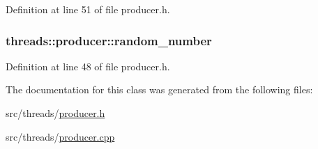 Definition at line 51 of file producer.\+h.

\subsubsection[{\texorpdfstring{random\+\_\+number}{random_number}}]{ threads\+::producer\+::random\+\_\+number\hspace{0.3cm}{\ttfamily [protected]}}\hypertarget{classthreads_1_1producer_a5ca9ba785a3f49123aea07f960e5497d}{}\label{classthreads_1_1producer_a5ca9ba785a3f49123aea07f960e5497d}


Definition at line 48 of file producer.\+h.



The documentation for this class was generated from the following files\+:\begin{DoxyCompactItemize}
\item 
src/threads/\hyperlink{producer_8h}{producer.\+h}\item 
src/threads/\hyperlink{producer_8cpp}{producer.\+cpp}\end{DoxyCompactItemize}
